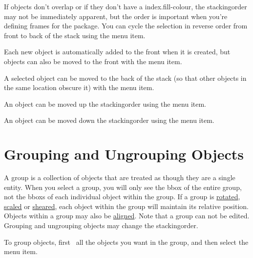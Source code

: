 If \glspl{object} don't overlap or if they don't have a
\gls{index.fill-colour}, the \gls{stackingorder} may not be
immediately apparent, but the order is important when you're
defining frames for the  package. You can cycle the
selection in reverse order from front to back of the stack using the
 menu item.


Each new \gls{object} is automatically added to the \gls{front} when it is
created, but \glspl{object} can also be moved to the \gls{front} 
with the  menu item.


A selected \gls{object} can be moved to the
\gls{back} of the \gls{stack} (so that other \glspl{object} in the
same location obscure it) with the  menu item.


An object can be moved up the \gls{stackingorder} using
the  menu item.


An object can be moved down the \gls{stackingorder} using
the  menu item.


\section{Grouping and Ungrouping Objects}\label{sec:grouping}

A \gls{group} is a collection of \glspl{object} that are treated as
though they are a single entity. When you select a \gls{group}, you
will only see the \gls{bbox} of the entire group, not the
\glspl*{bbox} of each individual object within the group. If a
\gls{group} is \hyperref[sec:rotateobjects]{rotated},
\hyperref[sec:scaleobjects]{scaled} or \hyperref[sec:shearobjects]{sheared}, each
\gls*{object} within the group will maintain its relative position.
Objects within a \gls{group} may also be
\hyperref[sec:alignobjects]{aligned}.  Note that a \gls{group} can
not be edited. Grouping and ungrouping \glspl*{object} may change
the \gls{stackingorder}.


To group \glspl*{object}, first \select\
all the objects you want in the \gls{group}, and then select the
\menu{transform.group} menu item.


